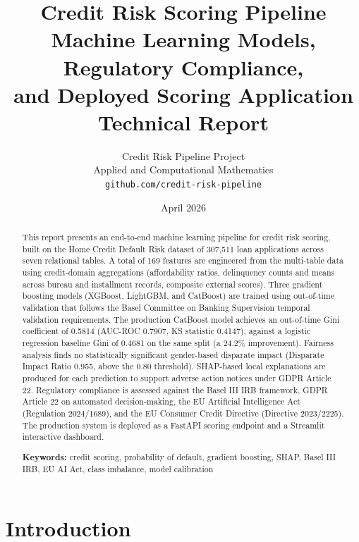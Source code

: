 \documentclass[11pt, a4paper]{article}
\title{%
  \vspace{-1cm}
  {\Large\bfseries Credit Risk Scoring Pipeline}\\[0.3cm]
  {\large Machine Learning Models, Regulatory Compliance,\\
  and Deployed Scoring Application}\\[0.5cm]
  {\normalsize Technical Report}
}
\author{%
  Credit Risk Pipeline Project\\
  {\small Applied and Computational Mathematics}\\
  {\small\texttt{github.com/credit-risk-pipeline}}
}
\date{April 2026}
\begin{document}
\maketitle
\thispagestyle{fancy}

\begin{abstract}
\noindent
This report presents an end-to-end machine learning pipeline for credit risk scoring, built on the Home Credit Default Risk dataset of 307,511 loan applications across seven relational tables. A total of 169 features are engineered from the multi-table data using credit-domain aggregations (affordability ratios, delinquency counts and means across bureau and installment records, composite external scores). Three gradient boosting models (XGBoost, LightGBM, and CatBoost) are trained using out-of-time validation that follows the Basel Committee on Banking Supervision temporal validation requirements. The production CatBoost model achieves an out-of-time Gini coefficient of 0.5814 (AUC-ROC 0.7907, KS statistic 0.4147), against a logistic regression baseline Gini of 0.4681 on the same split (a 24.2\% improvement). Fairness analysis finds no statistically significant gender-based disparate impact (Disparate Impact Ratio 0.955, above the 0.80 threshold). SHAP-based local explanations are produced for each prediction to support adverse action notices under GDPR Article 22. Regulatory compliance is assessed against the Basel III IRB framework, GDPR Article 22 on automated decision-making, the EU Artificial Intelligence Act (Regulation 2024/1689), and the EU Consumer Credit Directive (Directive 2023/2225). The production system is deployed as a FastAPI scoring endpoint and a Streamlit interactive dashboard.

\medskip
\noindent
\textbf{Keywords:} credit scoring, probability of default, gradient boosting, SHAP, Basel III IRB, EU AI Act, class imbalance, model calibration
\end{abstract}

\tableofcontents
\newpage

\section{Introduction}
\label{sec:introduction}
\end{document}

